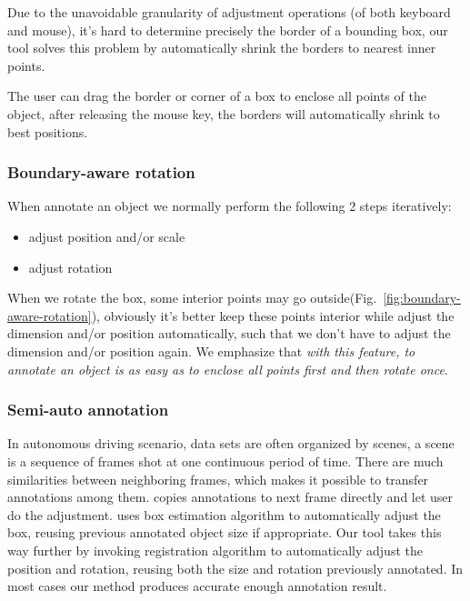 \documentclass[letterpaper, 10 pt, conference]{ieeeconf}  %
\begin{document}
Due to the unavoidable granularity of adjustment operations (of both keyboard and mouse), it's hard to determine precisely the border of a bounding box, our tool solves this problem by automatically shrink the borders to nearest inner points.

The user can drag the border or corner of a box to enclose all points of the object, after releasing the mouse key, the borders will automatically shrink to best positions.

\subsubsection{Boundary-aware rotation}

When annotate an object we normally perform the following 2 steps iteratively:
\begin{itemize}
	\item adjust position and/or scale
	\item adjust rotation	
\end{itemize}

When we rotate the box, some interior points may go outside(Fig.~\ref{fig:boundary-aware-rotation}), obviously it's better keep these points interior while adjust the dimension and/or position automatically, such that we don't have to adjust the dimension and/or position again. We emphasize that \emph{with this feature, to annotate an object is as easy as to enclose all points first and then rotate once}.




\subsubsection{Semi-auto annotation}
\label{semi-auto-anno}
In autonomous driving scenario, data sets are often organized by scenes\cite{Caesar2019nuScenesAM,Patil2019TheHD,lyft2019}, a scene is a sequence of frames shot at one continuous period of time. There are much similarities between neighboring frames, which makes it possible to transfer annotations among them. \cite{Zimmer20193DBA} copies annotations to next frame directly and let user do the adjustment.\cite{Wang2019LATTEAL} uses box estimation algorithm to automatically adjust the box, reusing previous annotated object size if appropriate. Our tool takes this way further by invoking registration algorithm \cite{Yang2016GoICPAG} to automatically adjust the position and rotation, reusing both the size and rotation previously annotated. In most cases our method produces  accurate enough annotation result.
\end{document}
